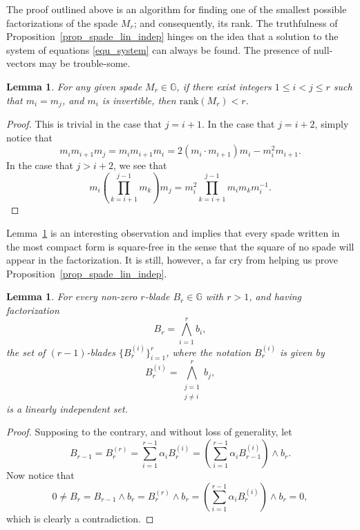 \documentclass{birkjour}
\newtheorem{lem}[thm]{Lemma}
\theoremstyle{definition}
\theoremstyle{remark}
\numberwithin{equation}{section}
\newcommand{\G}{\mathbb{G}}
\newcommand{\rank}{\mbox{rank}}
\begin{document}
The proof outlined above is an algorithm for finding one of the smallest possible factorizations of the spade $M_r$; and consequently, its rank.  The truthfulness of Proposition~\ref{prop_spade_lin_indep} hinges on the idea
that a solution to the system of equations \eqref{equ_system} can always be found.  The presence of null-vectors may be trouble-some.

\begin{lem}\label{lem_no_dup_in_factorization}
For any given spade $M_r\in\G$, if there exist integers $1\leq i<j\leq r$ such that $m_i=m_j$, and $m_i$ is invertible, then $\rank(M_r)<r$.
\end{lem}
\begin{proof}
This is trivial in the case that $j=i+1$.  In the case that $j=i+2$, simply notice that
\begin{equation*}
m_im_{i+1}m_j = m_im_{i+1}m_i = 2(m_i\cdot m_{i+1})m_i-m_i^2 m_{i+1}.
\end{equation*}
In the case that $j>i+2$, we see that
\begin{equation*}
m_i\left(\prod_{k=i+1}^{j-1}m_k\right)m_j = m_i^2\prod_{k=i+1}^{j-1}m_im_km_i^{-1}.
\end{equation*}
\end{proof}

Lemma~\ref{lem_no_dup_in_factorization} is an interesting observation and implies that every spade written in the most compact form is square-free in the
sense that the square of no spade will appear in the factorization.  It is still, however, a far cry from helping us prove Proposition~\ref{prop_spade_lin_indep}.

\begin{lem}\label{lem_lin_indep_subblades}
For every non-zero $r$-blade $B_r\in\G$ with $r>1$, and having factorization
\begin{equation*}
B_r = \bigwedge_{i=1}^r b_i,
\end{equation*}
the set of $(r-1)$-blades $\{B_r^{(i)}\}_{i=1}^r$, where the notation $B_r^{(i)}$ is given by
\begin{equation*}
B_r^{(i)}=\bigwedge_{\substack{j=1\\j\neq i}}^r b_j,
\end{equation*}
is a linearly independent set.
\end{lem}
\begin{proof}
Supposing to the contrary, and without loss of generality, let
\begin{equation*}
B_{r-1} = B_r^{(r)} = \sum_{i=1}^{r-1}\alpha_i B_r^{(i)} = \left(\sum_{i=1}^{r-1}\alpha_i B_{r-1}^{(i)}\right)\wedge b_r.
\end{equation*}
Now notice that
\begin{equation*}
0\neq B_r = B_{r-1}\wedge b_r = B_r^{(r)}\wedge b_r = \left(\sum_{i=1}^{r-1}\alpha_i B_r^{(i)}\right)\wedge b_r = 0,
\end{equation*}
which is clearly a contradiction.
\end{proof}
\end{document}
